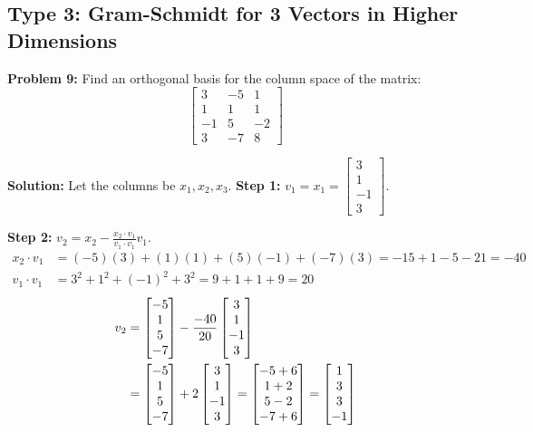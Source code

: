 \documentclass[11pt, letterpaper]{article}
\theoremstyle{definition}
\theoremstyle{remark}
\begin{document}
\subsection{Type 3: Gram-Schmidt for 3 Vectors in Higher Dimensions}

\textbf{Problem 9:} 
Find an orthogonal basis for the column space of the matrix:
\[ \begin{bmatrix} 3 & -5 & 1 \\ 1 & 1 & 1 \\ -1 & 5 & -2 \\ 3 & -7 & 8 \end{bmatrix} \]

\textbf{Solution:}
Let the columns be $x_1, x_2, x_3$.
\textbf{Step 1:} $v_1 = x_1 = \begin{bmatrix} 3 \\ 1 \\ -1 \\ 3 \end{bmatrix}$.

\textbf{Step 2:} $v_2 = x_2 - \frac{x_2 \cdot v_1}{v_1 \cdot v_1}v_1$.
\begin{align*}
    x_2 \cdot v_1 &= (-5)(3) + (1)(1) + (5)(-1) + (-7)(3) = -15 + 1 - 5 - 21 = -40 \\
    v_1 \cdot v_1 &= 3^2 + 1^2 + (-1)^2 + 3^2 = 9 + 1 + 1 + 9 = 20
\end{align*}
\begin{align*}
    v_2 &= \begin{bmatrix} -5 \\ 1 \\ 5 \\ -7 \end{bmatrix} - \frac{-40}{20} \begin{bmatrix} 3 \\ 1 \\ -1 \\ 3 \end{bmatrix} \\ \relax
    &= \begin{bmatrix} -5 \\ 1 \\ 5 \\ -7 \end{bmatrix} + 2 \begin{bmatrix} 3 \\ 1 \\ -1 \\ 3 \end{bmatrix} = \begin{bmatrix} -5 + 6 \\ 1 + 2 \\ 5 - 2 \\ -7 + 6 \end{bmatrix} = \begin{bmatrix} 1 \\ 3 \\ 3 \\ -1 \end{bmatrix}
\end{align*}
\end{document}
